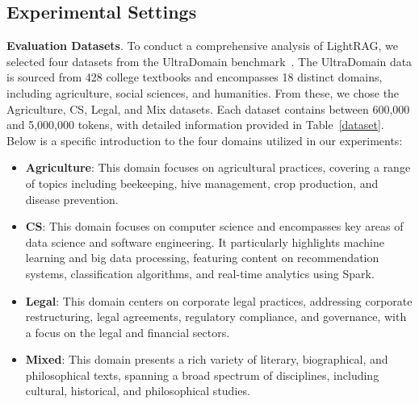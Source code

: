 \documentclass{article} %
\def\model{LightRAG}
\begin{document}
\subsection{Experimental Settings}
\textbf{Evaluation Datasets}.
To conduct a comprehensive analysis of \model, we selected four datasets from the UltraDomain benchmark~\citep{qian2024memorag}. The UltraDomain data is sourced from 428 college textbooks and encompasses 18 distinct domains, including agriculture, social sciences, and humanities. From these, we chose the Agriculture, CS, Legal, and Mix datasets. Each dataset contains between 600,000 and 5,000,000 tokens, with detailed information provided in Table~\ref{dataset}. Below is a specific introduction to the four domains utilized in our experiments:
\begin{itemize}[leftmargin=*]
    \item \textbf{Agriculture}: This domain focuses on agricultural practices, covering a range of topics including beekeeping, hive management, crop production, and disease prevention.
    
    \item  \textbf{CS}: This domain focuses on computer science and encompasses key areas of data science and software engineering. It particularly highlights machine learning and big data processing, featuring content on recommendation systems, classification algorithms, and real-time analytics using Spark.
    
    \item \textbf{Legal}: This domain centers on corporate legal practices, addressing corporate restructuring, legal agreements, regulatory compliance, and governance, with a focus on the legal and financial sectors.
    
    \item \textbf{Mixed}: This domain presents a rich variety of literary, biographical, and philosophical texts, spanning a broad spectrum of disciplines, including cultural, historical, and philosophical studies.
\end{itemize}
\end{document}
